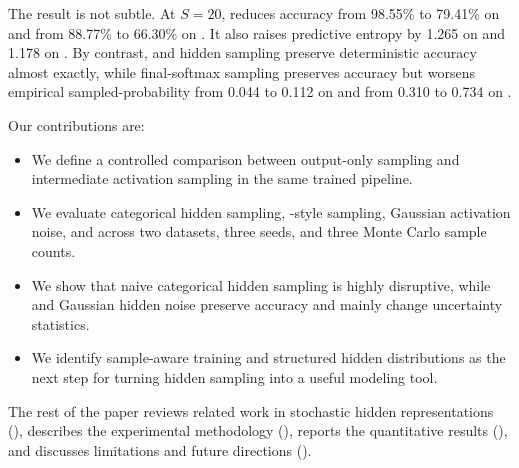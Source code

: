 The result is not subtle. At $S=20$, \hiddencategorical reduces accuracy from 98.55\% to 79.41\% on \mnist and from 88.77\% to 66.30\% on \fashionmnist. It also raises predictive entropy by 1.265 on \mnist and 1.178 on \fashionmnist. By contrast, \sap and \gaussian hidden sampling preserve deterministic accuracy almost exactly, while final-softmax sampling preserves accuracy but worsens empirical sampled-probability \nll from 0.044 to 0.112 on \mnist and from 0.310 to 0.734 on \fashionmnist.

Our contributions are:
\begin{itemize}[leftmargin=*,itemsep=0pt,topsep=0pt]
    \item We define a controlled comparison between output-only sampling and intermediate activation sampling in the same trained \cnn pipeline.
    \item We evaluate categorical hidden sampling, \sap-style sampling, Gaussian activation noise, and \mcdropout across two datasets, three seeds, and three Monte Carlo sample counts.
    \item We show that naive categorical hidden sampling is highly disruptive, while \sap and Gaussian hidden noise preserve accuracy and mainly change uncertainty statistics.
    \item We identify sample-aware training and structured hidden distributions as the next step for turning hidden sampling into a useful modeling tool.
\end{itemize}

The rest of the paper reviews related work in stochastic hidden representations (), describes the experimental methodology (), reports the quantitative results (), and discusses limitations and future directions ().
